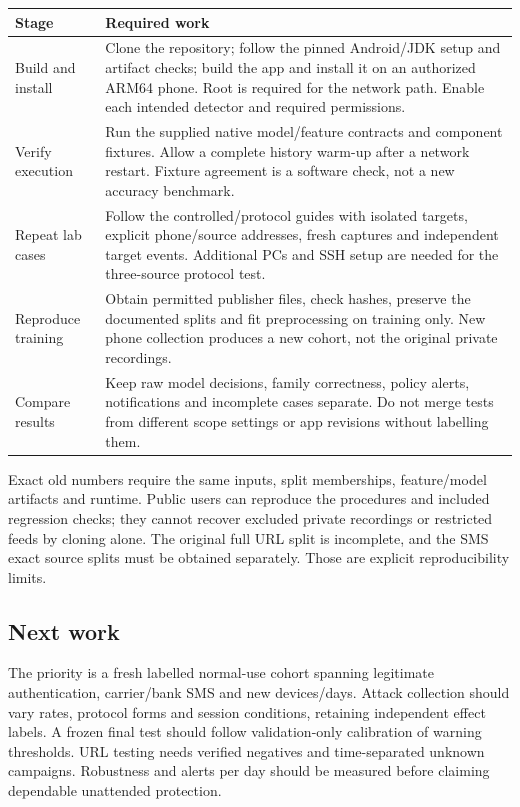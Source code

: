 \documentclass[11pt,a4paper]{article}
\begin{document}
\begin{tabularx}{\textwidth}{@{}L{33mm}Y@{}}
\toprule Stage & Required work\\\midrule
Build and install & Clone the repository; follow the pinned Android/JDK setup and artifact checks; build the app and install it on an authorized ARM64 phone. Root is required for the network path. Enable each intended detector and required permissions.\\
Verify execution & Run the supplied native model/feature contracts and component fixtures. Allow a complete history warm-up after a network restart. Fixture agreement is a software check, not a new accuracy benchmark.\\
Repeat lab cases & Follow the controlled/protocol guides with isolated targets, explicit phone/source addresses, fresh captures and independent target events. Additional PCs and SSH setup are needed for the three-source protocol test.\\
Reproduce training & Obtain permitted publisher files, check hashes, preserve the documented splits and fit preprocessing on training only. New phone collection produces a new cohort, not the original private recordings.\\
Compare results & Keep raw model decisions, family correctness, policy alerts, notifications and incomplete cases separate. Do not merge tests from different scope settings or app revisions without labelling them.\\
\bottomrule
\end{tabularx}

Exact old numbers require the same inputs, split memberships, feature/model artifacts
and runtime. Public users can reproduce the procedures and included regression checks;
they cannot recover excluded private recordings or restricted feeds by cloning alone.
The original full URL split is incomplete, and the SMS exact source splits must be
obtained separately. Those are explicit reproducibility limits.

\subsection*{Next work}
The priority is a fresh labelled normal-use cohort spanning legitimate authentication,
carrier/bank SMS and new devices/days. Attack collection should vary rates, protocol
forms and session conditions, retaining independent effect labels. A frozen final test
should follow validation-only calibration of warning thresholds. URL testing needs verified
negatives and time-separated unknown campaigns. Robustness and alerts per day should be
measured before claiming dependable unattended protection.
\end{document}
